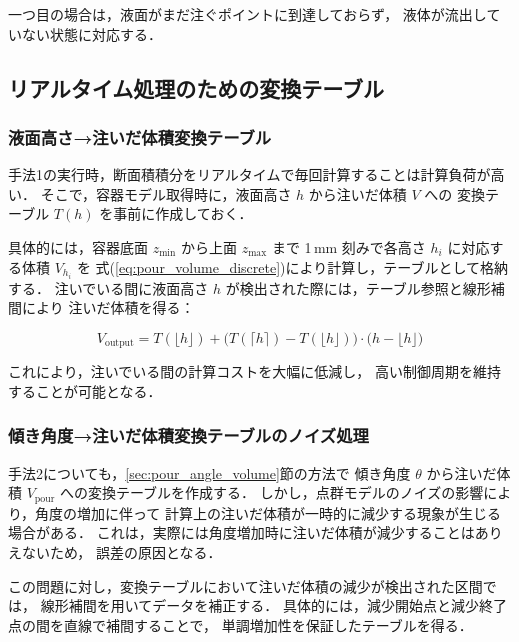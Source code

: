 一つ目の場合は，液面がまだ注ぐポイントに到達しておらず，
液体が流出していない状態に対応する．

\subsection{リアルタイム処理のための変換テーブル}
\label{sec:pour_transform_table}

\subsubsection{液面高さ→注いだ体積変換テーブル}

手法1の実行時，断面積積分をリアルタイムで毎回計算することは計算負荷が高い．
そこで，容器モデル取得時に，液面高さ $h$ から注いだ体積 $V$ への
変換テーブル $T(h)$ を事前に作成しておく．

具体的には，容器底面 $z_{\mathrm{min}}$ から上面 $z_{\mathrm{max}}$ まで
1\,mm 刻みで各高さ $h_i$ に対応する体積 $V_{h_i}$ を
式(\ref{eq:pour_volume_discrete})により計算し，テーブルとして格納する．
注いでいる間に液面高さ $h$ が検出された際には，テーブル参照と線形補間により
注いだ体積を得る：

\begin{equation}
  V_{\mathrm{output}} = T(\lfloor h \rfloor) 
  + \bigl(T(\lceil h \rceil) - T(\lfloor h \rfloor)\bigr)
  \cdot \bigl(h - \lfloor h \rfloor\bigr)
  \label{eq:pour_table_interp}
\end{equation}

これにより，注いでいる間の計算コストを大幅に低減し，
高い制御周期を維持することが可能となる．

\subsubsection{傾き角度→注いだ体積変換テーブルのノイズ処理}

手法2についても，\ref{sec:pour_angle_volume}節の方法で
傾き角度 $\theta$ から注いだ体積 $V_{\mathrm{pour}}$ への変換テーブルを作成する．
しかし，点群モデルのノイズの影響により，角度の増加に伴って
計算上の注いだ体積が一時的に減少する現象が生じる場合がある．
これは，実際には角度増加時に注いだ体積が減少することはありえないため，
誤差の原因となる．

この問題に対し，変換テーブルにおいて注いだ体積の減少が検出された区間では，
線形補間を用いてデータを補正する．
具体的には，減少開始点と減少終了点の間を直線で補間することで，
単調増加性を保証したテーブルを得る．


